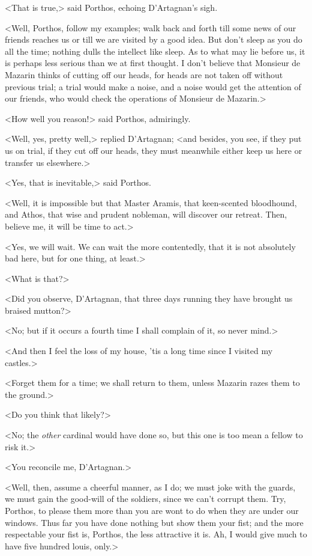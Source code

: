 <That is true,> said Porthos, echoing D'Artagnan's sigh.

<Well, Porthos, follow my examples; walk back and forth till some news of our friends reaches us or till we are visited by a good idea. But don't sleep as you do all the time; nothing dulls the intellect like sleep. As to what may lie before us, it is perhaps less serious than we at first thought. I don't believe that Monsieur de Mazarin thinks of cutting off our heads, for heads are not taken off without previous trial; a trial would make a noise, and a noise would get the attention of our friends, who would check the operations of Monsieur de Mazarin.>

<How well you reason!> said Porthos, admiringly.

<Well, yes, pretty well,> replied D'Artagnan; <and besides, you see, if they put us on trial, if they cut off our heads, they must meanwhile either keep us here or transfer us elsewhere.>

<Yes, that is inevitable,> said Porthos.

<Well, it is impossible but that Master Aramis, that keen-scented bloodhound, and Athos, that wise and prudent nobleman, will discover our retreat. Then, believe me, it will be time to act.>

<Yes, we will wait. We can wait the more contentedly, that it is not absolutely bad here, but for one thing, at least.>

<What is that?>

<Did you observe, D'Artagnan, that three days running they have brought us braised mutton?>

<No; but if it occurs a fourth time I shall complain of it, so never mind.>

<And then I feel the loss of my house, 'tis a long time since I visited my castles.>

<Forget them for a time; we shall return to them, unless Mazarin razes them to the ground.>

<Do you think that likely?>

<No; the \emph{other} cardinal would have done so, but this one is too mean a fellow to risk it.>

<You reconcile me, D'Artagnan.>

<Well, then, assume a cheerful manner, as I do; we must joke with the guards, we must gain the good-will of the soldiers, since we can't corrupt them. Try, Porthos, to please them more than you are wont to do when they are under our windows. Thus far you have done nothing but show them your fist; and the more respectable your fist is, Porthos, the less attractive it is. Ah, I would give much to have five hundred louis, only.>

